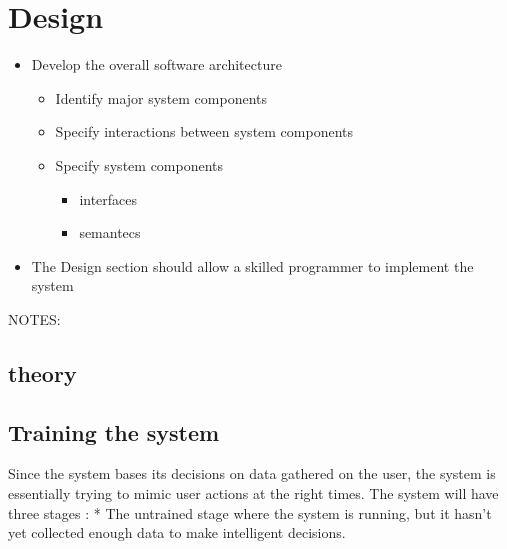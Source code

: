 \chapter{Design}
\label{design}

\begin{itemize}
\item Develop the overall software architecture

\begin{itemize}
\item Identify major system components

\item Specify interactions between system components

\item Specify system components

\begin{itemize}
\item interfaces

\item semantecs

\end{itemize}

\end{itemize}

\item The Design section should allow a skilled programmer to implement the system

\end{itemize}

NOTES:



\section{theory}
\label{theory}



\section{Training the system}
\label{trainingthesystem}



Since the system bases its decisions on data gathered on the user, the system is essentially trying to mimic user actions at the right times. The system will have three stages :
* The untrained stage where the system is running, but it hasn't yet collected enough data to make intelligent decisions. 

